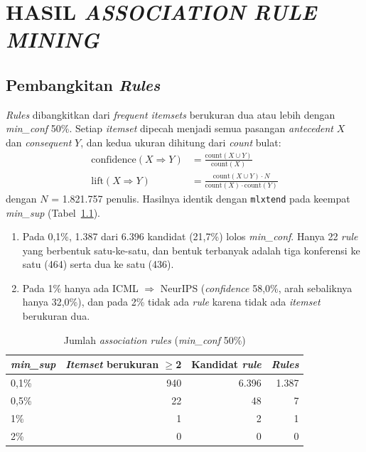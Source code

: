 \chapter{HASIL \textit{ASSOCIATION RULE MINING}}
\label{chap:rules}\label{sec:hasil-t5}

\section{Pembangkitan \textit{Rules}}
\label{sec:hasil-t5-bangkit}
\textit{Rules} dibangkitkan dari \textit{frequent itemsets} berukuran dua atau lebih dengan \textit{min\_conf} 50\%. Setiap \textit{itemset} dipecah menjadi semua pasangan \textit{antecedent} $X$ dan \textit{consequent} $Y$, dan kedua ukuran dihitung dari \textit{count} bulat:
\begin{align}
\mathrm{confidence}(X \Rightarrow Y) &= \frac{\mathrm{count}(X \cup Y)}{\mathrm{count}(X)} \\
\mathrm{lift}(X \Rightarrow Y) &= \frac{\mathrm{count}(X \cup Y) \cdot N}{\mathrm{count}(X) \cdot \mathrm{count}(Y)}
\end{align}
dengan $N$ = 1.821.757 penulis. Hasilnya identik dengan \texttt{mlxtend} pada keempat \textit{min\_sup} (Tabel~\ref{tab:t5-jumlah}).
\begin{enumerate}
\item Pada 0,1\%, 1.387 dari 6.396 kandidat (21,7\%) lolos \textit{min\_conf}. Hanya 22 \textit{rule} yang berbentuk satu-ke-satu, dan bentuk terbanyak adalah tiga konferensi ke satu (464) serta dua ke satu (436).
\item Pada 1\% hanya ada ICML $\Rightarrow$ NeurIPS (\textit{confidence} 58,0\%, arah sebaliknya hanya 32,0\%), dan pada 2\% tidak ada \textit{rule} karena tidak ada \textit{itemset} berukuran dua.
\end{enumerate}

\begin{table}[!htb]
\caption{Jumlah \textit{association rules} (\textit{min\_conf} 50\%)}
\label{tab:t5-jumlah}
\small
\begin{tabular*}{\textwidth}{@{\extracolsep{\fill}}@{}lrrr@{}}
\toprule
\textbf{\textit{min\_sup}} & \textbf{\textit{Itemset} berukuran $\geq$2} & \textbf{Kandidat \textit{rule}} & \textbf{\textit{Rules}} \\
\midrule
0,1\% & 940 & 6.396 & 1.387 \\
0,5\% & 22 & 48 & 7 \\
1\% & 1 & 2 & 1 \\
2\% & 0 & 0 & 0 \\
\bottomrule
\end{tabular*}
\end{table}


